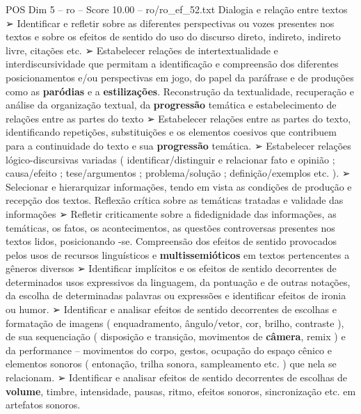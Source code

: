 \begin{textsample}{POS Dim 5 – ro – Score 10.00 – ro/ro\_ef\_52.txt}
Dialogia e relação entre textos {\EmojiFont ➢} Identificar e refletir sobre as diferentes perspectivas ou vozes presentes nos textos e sobre os efeitos de sentido do uso do discurso direto, indireto, indireto livre, citações etc. {\EmojiFont ➢} Estabelecer relações de intertextualidade e interdiscursividade que permitam a identificação e compreensão dos diferentes posicionamentos e/ou perspectivas em jogo, do papel da paráfrase e de produções como as \textbf{paródias} e a \textbf{estilizações}.
Reconstrução da textualidade, recuperação e análise da organização textual, da \textbf{progressão} temática e estabelecimento de relações entre as partes do texto {\EmojiFont ➢} Estabelecer relações entre as partes do texto, identificando repetições, substituições e os elementos coesivos que contribuem para a continuidade do texto e sua \textbf{progressão} temática. {\EmojiFont ➢} Estabelecer relações lógico-discursivas variadas ( identificar/distinguir e relacionar fato e opinião ; causa/efeito ; tese/argumentos ; problema/solução ; definição/exemplos etc. ). {\EmojiFont ➢} Selecionar e hierarquizar informações, tendo em vista as condições de produção e recepção dos textos.
Reflexão crítica sobre as temáticas tratadas e validade das informações {\EmojiFont ➢} Refletir criticamente sobre a fidedignidade das informações, as temáticas, os fatos, os acontecimentos, as questões controversas presentes nos textos lidos, posicionando -se.
Compreensão dos efeitos de sentido provocados pelos usos de recursos linguísticos e \textbf{multissemióticos} em textos pertencentes a gêneros diversos {\EmojiFont ➢} Identificar implícitos e os efeitos de sentido decorrentes de determinados usos expressivos da linguagem, da pontuação e de outras notações, da escolha de determinadas palavras ou expressões e identificar efeitos de ironia ou humor. {\EmojiFont ➢} Identificar e analisar efeitos de sentido decorrentes de escolhas e formatação de imagens ( enquadramento, ângulo/vetor, cor, brilho, contraste ), de sua sequenciação ( disposição e transição, movimentos de \textbf{câmera}, remix ) e da performance – movimentos do corpo, gestos, ocupação do espaço cênico e elementos sonoros ( entonação, trilha sonora, sampleamento etc. ) que nela se relacionam. {\EmojiFont ➢} Identificar e analisar efeitos de sentido decorrentes de escolhas de \textbf{volume}, timbre, intensidade, pausas, ritmo, efeitos sonoros, sincronização etc. em artefatos sonoros.

\end{textsample}
